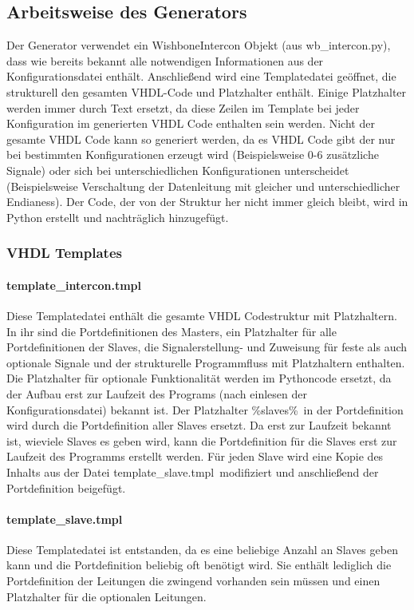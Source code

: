 \documentclass{article}
\newcommand{\nl}{\leavevmode\newline}
\begin{document}
\subsection{Arbeitsweise des Generators}
Der Generator verwendet ein WishboneIntercon Objekt (aus wb\_intercon.py), dass wie bereits bekannt alle notwendigen Informationen aus der Konfigurationsdatei enthält. Anschließend wird eine Templatedatei geöffnet, die strukturell den gesamten VHDL-Code und Platzhalter enthält. Einige Platzhalter werden immer durch Text ersetzt, da diese Zeilen im Template bei jeder Konfiguration im generierten VHDL Code enthalten sein werden. Nicht der gesamte VHDL Code kann so generiert werden, da es VHDL Code gibt der nur bei bestimmten Konfigurationen erzeugt wird (Beispielsweise 0-6 zusätzliche Signale) oder sich bei unterschiedlichen Konfigurationen unterscheidet (Beispielsweise Verschaltung der Datenleitung mit gleicher und unterschiedlicher Endianess). Der Code, der von der Struktur her nicht immer gleich bleibt, wird in Python erstellt und nachträglich hinzugefügt.
\subsubsection{VHDL Templates}
\paragraph{template\_intercon.tmpl}\nl
Diese Templatedatei enthält die gesamte VHDL Codestruktur mit Platzhaltern. In ihr sind die Portdefinitionen des Masters, ein Platzhalter für alle Portdefinitionen der Slaves, die Signalerstellung- und Zuweisung für feste als auch optionale Signale und der strukturelle Programmfluss mit Platzhaltern enthalten. Die Platzhalter für optionale Funktionalität werden im Pythoncode ersetzt, da der Aufbau erst zur Laufzeit des Programs (nach einlesen der Konfigurationsdatei) bekannt ist. Der Platzhalter \glqq \%slaves\%\grqq\ in der Portdefinition wird durch die Portdefinition aller Slaves ersetzt. Da erst zur Laufzeit bekannt ist, wieviele Slaves es geben wird, kann die Portdefinition für die Slaves erst zur Laufzeit des Programms erstellt werden. Für jeden Slave wird eine Kopie des Inhalts aus der Datei \glqq template\_slave.tmpl\grqq\ modifiziert und anschließend der Portdefinition beigefügt.
\paragraph{template\_slave.tmpl}\nl
Diese Templatedatei ist entstanden, da es eine beliebige Anzahl an Slaves geben kann und die Portdefinition beliebig oft benötigt wird. Sie enthält lediglich die Portdefinition der Leitungen die zwingend vorhanden sein müssen und einen Platzhalter für die optionalen Leitungen.
\end{document}
